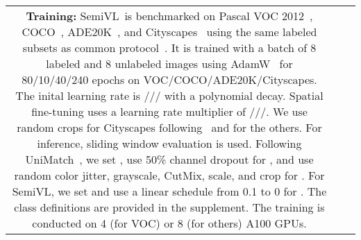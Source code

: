 \documentclass[10pt,twocolumn,letterpaper]{article}
\newcommand{\ours}{SemiVL}
\begin{document}
\begin{figure*}
\begin{tabular}{ccc}
\noindent\textbf{Training:}
\ours\ is benchmarked on Pascal VOC 2012~\cite{everingham2010pascal}, COCO~\cite{caesar2018coco}, ADE20K~\cite{zhou2017scene}, and Cityscapes~\cite{cordts2016cityscapes} using the same labeled subsets as common protocol~\cite{zou2020pseudoseg,chen2021semi,wang2022semi,yang2023revisiting}.
It is trained with a batch of 8 labeled and 8 unlabeled images using AdamW~\cite{loshchilov2017decoupled} for 80/10/40/240 epochs on VOC/COCO/ADE20K/Cityscapes. The inital learning rate is /// with a  polynomial decay. Spatial fine-tuning uses a learning rate multiplier of ///. We use  random crops for Cityscapes following~\cite{yang2023revisiting} and  for the others. For inference, sliding window evaluation is used.
Following UniMatch~\cite{yang2023revisiting}, we set , use 50\% channel dropout for , and use random color jitter, grayscale, CutMix, scale, and crop for .
For \ours, we set  and use a linear schedule from 0.1 to 0 for . The class definitions are provided in the supplement. The training is conducted on 4 (for VOC) or 8 (for others) A100 GPUs.


\end{tabular}
\end{figure*}
\end{document}
